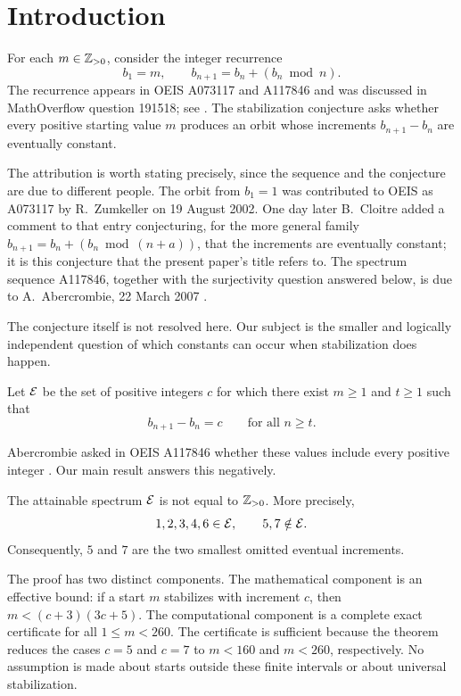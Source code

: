 \section{Introduction}

For each $m\in\mathbb{Z}_{>0}$, consider the integer recurrence
\begin{equation}
 b_1=m,\qquad b_{n+1}=b_n+(b_n\bmod n).
 \label{eq:recurrence}
\end{equation}
The recurrence appears in OEIS A073117 and A117846 and was discussed in MathOverflow question 191518; see \cite{oeisA073117,oeisA117846,mathoverflow191518}. The stabilization conjecture asks whether every positive starting value $m$ produces an orbit whose increments $b_{n+1}-b_n$ are eventually constant.

The attribution is worth stating precisely, since the sequence and the conjecture are due to different people. The orbit from $b_1=1$ was contributed to OEIS as A073117 by R.~Zumkeller on 19 August 2002. One day later B.~Cloitre added a comment to that entry conjecturing, for the more general family $b_{n+1}=b_n+(b_n\bmod(n+a))$, that the increments are eventually constant; it is this conjecture that the present paper's title refers to. The spectrum sequence A117846, together with the surjectivity question answered below, is due to A.~Abercrombie, 22 March 2007 \cite{oeisA117846}.

The conjecture itself is not resolved here. Our subject is the smaller and logically independent question of which constants can occur when stabilization does happen.

\begin{definition}
Let $\mathcal{E}$ be the set of positive integers $c$ for which there exist $m\ge1$ and $t\ge1$ such that
\[
 b_{n+1}-b_n=c\qquad\text{for all }n\ge t.
\]
\end{definition}

Abercrombie asked in OEIS A117846 whether these values include every positive integer \cite{oeisA117846}. Our main result answers this negatively.

\begin{theorem}
The attainable spectrum $\mathcal{E}$ is not equal to $\mathbb{Z}_{>0}$. More precisely,
\[
 1,2,3,4,6\in\mathcal{E},
 \qquad
 5,7\notin\mathcal{E}.
\]
Consequently, $5$ and $7$ are the two smallest omitted eventual increments.
\end{theorem}

The proof has two distinct components. The mathematical component is an effective bound: if a start $m$ stabilizes with increment $c$, then $m<(c+3)(3c+5)$. The computational component is a complete exact certificate for all $1\le m<260$. The certificate is sufficient because the theorem reduces the cases $c=5$ and $c=7$ to $m<160$ and $m<260$, respectively. No assumption is made about starts outside these finite intervals or about universal stabilization.
